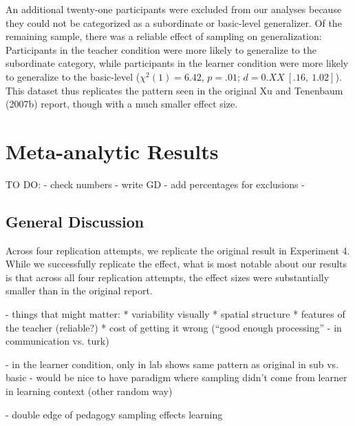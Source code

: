 \documentclass[man]{apa2}
\begin{document}
An additional twenty-one participants were excluded from our analyses because they could not be categorized as a subordinate or basic-level generalizer. Of the remaining sample, there was a reliable effect of sampling on generalization: Participants in the teacher condition were more likely to generalize to the subordinate category, while participants in the learner condition were more likely to generalize to the basic-level ($\chi^2(1) = 6.42$, $p = .01$; $d = 0.XX\ [.16,\ 1.02]$). This dataset thus replicates the pattern seen in the original Xu and Tenenbaum (2007b) report, though with a much smaller effect size.

\section{Meta-analytic Results}

\cite{Viechtbauer2010}


TO DO:
- check numbers
- write GD
- add percentages for exclusions
- 


\subsection{General Discussion}

Across four replication attempts, we replicate the original result in Experiment 4. While we successfully replicate the effect, what is most notable about our results is that across all four replication attempts, the effect sizes were substantially smaller than in the original report. 

- things that might matter:
* variability visually
* spatial structure
* features of the teacher (reliable?)
* cost of getting it wrong (``good enough processing'' - in communication vs. turk) 

- in the learner condition, only in lab shows same pattern as original in sub vs. basic
- would be nice to have paradigm where sampling didn't come from learner in learning context (other random way)

- double edge of pedagogy \cite{bonowitz2011double} sampling effects learning
\end{document}
